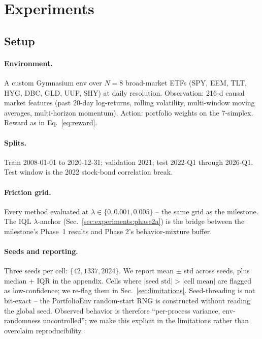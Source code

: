 
\section{Experiments}
\label{sec:experiments}

\subsection{Setup}
\label{sec:experiments:setup}

\paragraph{Environment.} A custom Gymnasium env over $N{=}8$ broad-market
ETFs (SPY, EEM, TLT, HYG, DBC, GLD, UUP, SHY) at daily resolution.
Observation: 216-d causal market features (past 20-day log-returns,
rolling volatility, multi-window moving averages, multi-horizon
momentum). Action: portfolio weights on the 7-simplex. Reward as in
Eq.~\ref{eq:reward}.

\paragraph{Splits.} Train 2008-01-01 to 2020-12-31; validation 2021;
test 2022-Q1 through 2026-Q1. Test window is the 2022 stock-bond
correlation break.

\paragraph{Friction grid.} Every method evaluated at $\lambda \in
\{0, 0.001, 0.005\}$ -- the same grid as the milestone. The IQL
$\lambda$-anchor (Sec.~\ref{sec:experiments:phase2a}) is the bridge
between the milestone's Phase~1 results and Phase 2's behavior-mixture
buffer.

\paragraph{Seeds and reporting.} Three seeds per cell: $\{42, 1337,
2024\}$. We report mean $\pm$ std across seeds, plus median + IQR in the
appendix. Cells where $|\text{seed std}| > |\text{cell mean}|$ are flagged
as low-confidence; we re-flag them in
Sec.~\ref{sec:limitations}. Seed-threading is not bit-exact -- the
PortfolioEnv random-start RNG is constructed without reading the global
seed. Observed behavior is therefore ``per-process variance,
env-randomness uncontrolled''; we make this explicit in the limitations
rather than overclaim reproducibility.

